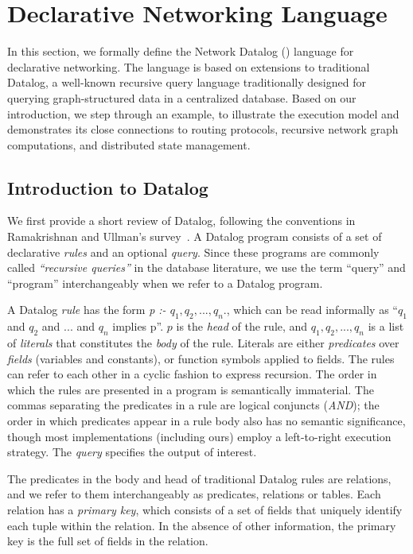 \section{Declarative Networking Language}
\label{sec:language}

In this section, we formally define the Network Datalog (\Lang) language
for declarative networking. The \Lang language is based on extensions to
traditional Datalog, a well-known recursive query language traditionally
designed for querying graph-structured data in a centralized
database. Based on our introduction, we step through an example, to
illustrate the execution model and demonstrates its close connections to
routing protocols, recursive network graph computations, and distributed
state management.
  

\subsection{Introduction to Datalog}
\label{sec:language: Datalog}
We first provide a short review of Datalog, following the conventions in
Ramakrishnan and Ullman's survey~\cite{ramakrishnan93survey}. A Datalog
program consists of a set of declarative {\em rules} and an optional
{\em query}. Since these programs are commonly called {\em ``recursive
  queries''} in the database literature, we use the term ``query'' and
``program'' interchangeably when we refer to a Datalog program.

A Datalog {\em rule} has the form {\em p :- $q_{1}, q_{2}, ...,
q_{n}$}., which can be read informally as ``$q_{1}$ and $q_{2}$ and $
... $ and $q_{n}$ implies p''. $p$ is the {\em head} of the rule, and
$q_{1}, q_{2}, ..., q_{n}$ is a list of {\em literals} that constitutes
the {\em body} of the rule.  Literals are either {\em predicates} over
{\em fields} (variables and constants), or function symbols applied to
fields. The rules can refer to each other in a cyclic fashion to express
recursion. The order in which the rules are presented in a program is
semantically immaterial.  The commas separating the predicates in a rule
are logical conjuncts ({\em AND}); the order in which predicates appear
in a rule body also has no semantic significance, though most
implementations (including ours) employ a left-to-right execution
strategy. The {\em query} specifies the output of interest.

The predicates in the body and head of traditional Datalog rules are
relations, and we refer to them interchangeably as predicates, relations
or tables.  Each relation has a {\em primary key}, which consists of a
set of fields that uniquely identify each tuple within the relation. In
the absence of other information, the primary key is the full set of
fields in the relation.

